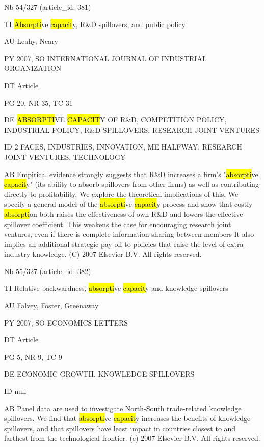 \documentclass[a4paper]{article}
\begin{document}
\vspace*{-2cm}
Nb \tabto{0cm}54/327 (article\_id: 381)\par
TI \tabto{0cm}\hl{Absorpti}ve \hl{capacit}y, R\&D spillovers, and public policy\par
AU \tabto{0cm}Leahy, Neary\par
PY \tabto{0cm}2007, SO INTERNATIONAL JOURNAL OF INDUSTRIAL ORGANIZATION\par
DT \tabto{0cm}Article\par
PG \tabto{0cm}20, NR 35, TC 31\par
DE \tabto{0cm}\hl{ABSORPTI}VE \hl{CAPACIT}Y OF R\&D, COMPETITION POLICY, INDUSTRIAL POLICY, R\&D SPILLOVERS, RESEARCH JOINT VENTURES\par
ID \tabto{0cm}2 FACES, INDUSTRIES, INNOVATION, ME HALFWAY, RESEARCH JOINT VENTURES, TECHNOLOGY\par
AB \tabto{0cm}Empirical evidence strongly suggests that R\&D increases a firm's "\hl{absorpti}ve \hl{capacit}y" (its ability to absorb spillovers from other firms) as well as contributing directly to profitability. We explore the theoretical implications of this. We specify a general model of the \hl{absorpti}ve \hl{capacit}y process and show that costly \hl{absorpti}on both raises the effectiveness of own R\&D and lowers the effective spillover coefficient. This weakens the case for encouraging research joint ventures, even if there is complete information sharing between members It also implies an additional strategic pay-off to policies that raise the level of extra-industry knowledge. (C) 2007 Elsevier B.V. All rights reserved.\par
\clearpage

\vspace*{-2cm}
Nb \tabto{0cm}55/327 (article\_id: 382)\par
TI \tabto{0cm}Relative backwardness, \hl{absorpti}ve \hl{capacit}y and knowledge spillovers\par
AU \tabto{0cm}Falvey, Foster, Greenaway\par
PY \tabto{0cm}2007, SO ECONOMICS LETTERS\par
DT \tabto{0cm}Article\par
PG \tabto{0cm}5, NR 9, TC 9\par
DE \tabto{0cm}ECONOMIC GROWTH, KNOWLEDGE SPILLOVERS\par
ID \tabto{0cm}null\par
AB \tabto{0cm}Panel data are used to investigate North-South trade-related knowledge spillovers. We find that \hl{absorpti}ve \hl{capacit}y increases the benefits of knowledge spillovers, and that spillovers have least impact in countries closest to and farthest from the technological frontier. (c) 2007 Elsevier B.V. All rights reserved.\par
\clearpage
\end{document}
